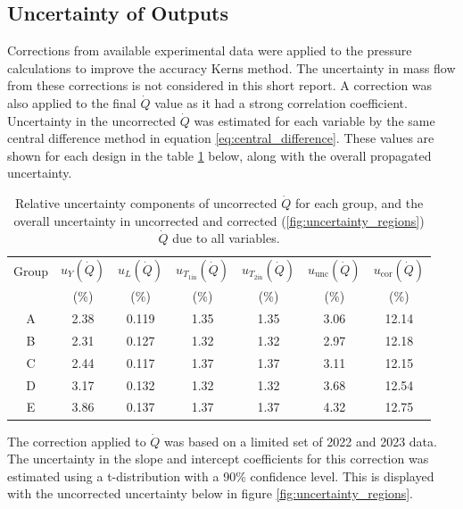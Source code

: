 \documentclass{article}
\begin{document}
\subsection{Uncertainty of Outputs}
Corrections from available experimental data were applied to the pressure calculations to improve the accuracy Kerns method.
The uncertainty in mass flow from these corrections is not considered in this short report.
A correction was also applied to the final $\dot{Q}$ value as it had a strong correlation coefficient.
Uncertainty in the uncorrected $\dot{Q}$ was estimated for each variable by the same central difference method in equation \ref{eq:central_difference}.
These values are shown for each design in the table \ref{tab:uncorrected_uncertainty} below, along with the overall propagated uncertainty.

\begin{table}[h!]
    \centering
    \begin{tabular}{c|ccccc|c}
        Group & $u_Y(\dot{Q})$ & $u_L(\dot{Q})$ & $u_{T_\text{1in}}(\dot{Q})$ & $u_{T_\text{2in}}(\dot{Q})$ & $u_\text{unc}(\dot{Q})$ & $u_\text{cor}(\dot{Q})$\\
         & (\%) & (\%) & (\%) & (\%) & (\%) & (\%) \\
        \hline
        A & 2.38 & 0.119 & 1.35 & 1.35 & 3.06 & 12.14 \\
        B & 2.31 & 0.127 & 1.32 & 1.32 & 2.97 & 12.18 \\
        C & 2.44 & 0.117 & 1.37 & 1.37 & 3.11 & 12.15 \\
        D & 3.17 & 0.132 & 1.32 & 1.32 & 3.68 & 12.54 \\
        E & 3.86 & 0.137 & 1.37 & 1.37 & 4.32 & 12.75 \\
    \end{tabular}
    \caption{Relative uncertainty components of uncorrected $\dot{Q}$ for each group, and the overall uncertainty in uncorrected and corrected (\ref{fig:uncertainty_regions}) $\dot{Q}$ due to all variables.}
    \label{tab:uncorrected_uncertainty}
\end{table}

The correction applied to $\dot{Q}$ was based on a limited set of 2022 and 2023 data.
The uncertainty in the slope and intercept coefficients for this correction was estimated using a t-distribution with a 90\% confidence level.
This is displayed with the uncorrected uncertainty below in figure \ref{fig:uncertainty_regions}.
\end{document}
